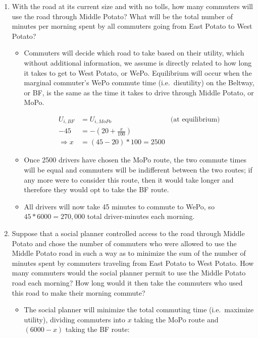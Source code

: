 \documentclass[]{article}
\providecommand{\tightlist}{%
  \setlength{\itemsep}{0pt}\setlength{\parskip}{0pt}}
\begin{document}
\begin{enumerate}
\def\labelenumi{\alph{enumi})}
\item
  With the road at its current size and with no tolls, how many
  commuters will use the road through Middle Potato? What will be the
  total number of minutes per morning spent by all commuters going from
  East Potato to West Potato?

  \begin{itemize}
  \tightlist
  \item
    Commuters will decide which road to take based on their utility,
    which without additional information, we assume is directly related
    to how long it takes to get to West Potato, or WePo. Equilibrium
    will occur when the marginal commuter's WePo commute time
    (i.e.~disutility) on the Beltway, or BF, is the same as the time it
    takes to drive through Middle Potato, or MoPo.

    \begin{align*}
      U_{i,BF} &= U_{i,MoPo} &\text{(at equilibrium)}\\
      -45 &= -(20 + \frac{x}{100})\\
      \Rightarrow x &= (45 - 20) * 100  = 2500 
    \end{align*}
  \item
    Once 2500 drivers have chosen the MoPo route, the two commute times
    will be equal and commuters will be indifferent between the two
    routes; if any more were to consider this route, then it would take
    longer and therefore they would opt to take the BF route.
  \item
    All drivers will now take 45 minutes to commute to WePo, so
    \(45 * 6000 = 270,000\) total driver-minutes each morning.
  \end{itemize}
\item
  Suppose that a social planner controlled access to the road through
  Middle Potato and chose the number of commuters who were allowed to
  use the Middle Potato road in such a way as to minimize the sum of the
  number of minutes spent by commuters traveling from East Potato to
  West Potato. How many commuters would the social planner permit to use
  the Middle Potato road each morning? How long would it then take the
  commuters who used this road to make their morning commute?

  \begin{itemize}
  \tightlist
  \item
    The social planner will minimize the total commuting time
    (i.e.~maximize utility), dividing commuters into \(x\) taking the
    MoPo route and \((6000 - x)\) taking the BF route:


\end{itemize}
\end{enumerate}
\end{document}
